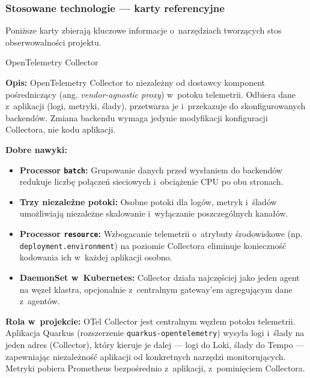 \subsubsection{Stosowane technologie --- karty referencyjne}
Poniższe karty zbierają kluczowe informacje o~narzędziach tworzących stos obserwowalności projektu.

\begin{techcard}{OpenTelemetry Collector}

\textbf{Opis:} OpenTelemetry Collector to niezależny od dostawcy komponent pośredniczący (ang. \textit{vendor-agnostic proxy}) w~potoku telemetrii. Odbiera dane z~aplikacji (logi, metryki, ślady), przetwarza je i~przekazuje do skonfigurowanych backendów. Zmiana backendu wymaga jedynie modyfikacji konfiguracji Collectora, nie kodu aplikacji.

\textbf{Dobre nawyki:}
\begin{itemize}
  \item \textbf{Processor \texttt{batch}:} Grupowanie danych przed wysłaniem do backendów redukuje liczbę połączeń sieciowych i~obciążenie CPU po obu stronach.
  \item \textbf{Trzy niezależne potoki:} Osobne potoki dla logów, metryk i~śladów umożliwiają niezależne skalowanie i~wyłączanie poszczególnych kanałów.
  \item \textbf{Processor \texttt{resource}:} Wzbogacanie telemetrii o~atrybuty środowiskowe (np. \texttt{deployment.environment}) na poziomie Collectora eliminuje konieczność kodowania ich w~każdej aplikacji osobno.
  \item \textbf{DaemonSet w~Kubernetes:} Collector działa najczęściej jako jeden agent na węzeł klastra, opcjonalnie z~centralnym gateway'em agregującym dane z~agentów.
\end{itemize}

\textbf{Rola w~projekcie:} OTel Collector jest centralnym węzłem potoku telemetrii. Aplikacja Quarkus (rozszerzenie \texttt{quarkus-opentelemetry}) wysyła logi i~ślady na jeden adres (Collector), który kieruje je dalej --- logi do Loki, ślady do Tempo --- zapewniając niezależność aplikacji od konkretnych narzędzi monitorujących. Metryki pobiera Prometheus bezpośrednio z~aplikacji, z~pominięciem Collectora.

\end{techcard}

